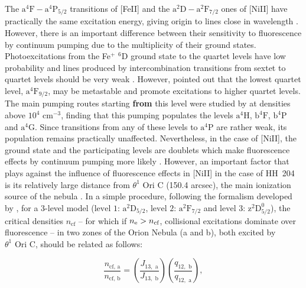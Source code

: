 \documentclass[twocolumn,linenumbers]{aastex63}
\begin{document}
The $\text{a}^{4}\text{F}-\text{a}^{4}\text{P}_{5/2}$ transitions of [Fe\thinspace II] and the $\text{a}^{2}\text{D}-\text{a}^{2}\text{F}_{7/2}$ ones of [Ni\thinspace II] have practically the same excitation energy, giving origin to lines close in wavelength \citep{Bautista96}. However, there is an important difference between their sensitivity to fluorescence by continuum pumping due to the  multiplicity of their ground states. Photoexcitations from the Fe$^{+}$ $^6\text{D}$ ground state to the quartet levels have low probability and lines produced by  intercombination transitions from sextet to quartet levels should be very weak \citep{Bautista98}. However, \citet{rodriguez99} pointed out that the lowest quartet level,  $\text{a}^{4}\text{F}_{9/2}$, may be metastable and promote excitations to higher quartet levels. The main pumping routes starting {\bf from} this level were studied by \citet{verner00} at densities  above $10^4 \text{ cm}^{-3}$, finding that this pumping populates the levels $\text{a}^{4}\text{H}$, $\text{b}^{4}\text{F}$, $\text{b}^{4}\text{P}$ and $\text{a}^{4}\text{G}$. Since transitions from any of these levels to $\text{a}^{4}\text{P}$ are rather weak, its population remains practically unaffected. Nevertheless, in the case of [Ni\thinspace II], the ground state and the participating levels are doublets which make fluorescence effects by continuum pumping more likely  \citep{Bautista96}. However, an important factor that plays against the influence of fluorescence effects in [Ni\thinspace II] in the case of HH~204 is its relatively large distance from $\theta^{1} \text{ Ori C}$ (150.4 arcsec), the main ionization source of the nebula \citep{ODell:2015a, odell17_ionizing}. In a simple procedure, following the formalism developed by \citet[][their equation 8]{Bautista96},   for a 3-level model ($\text{level 1: }\text{a}^2\text{D}_{5/2}$, $\text{level 2: } \text{a}^2\text{F}_{7/2}$ and $\text{level 3: }\text{z}^2\text{D}^{0}_{5/2}$), the critical densities $n_{\text{cf}}$ -- for which if $n_{\rm e}>n_{\text{cf}}$, collisional excitations dominate over fluorescence -- in two zones of the Orion Nebula (a and b), both excited by $\theta^{1} \text{ Ori C}$, should be related as follows:

\begin{equation}
    \label{eq:ni2}
    \frac{n_{\text{cf, a}}}{n_{\text{cf, b}}}=\left( \frac{J_{13,\text{ a}}}{J_{13,\text{ b}}}\right)\left( \frac{q_{12,\text{ b}}}{q_{12,\text{ a}}} \right),
\end{equation}
\end{document}
